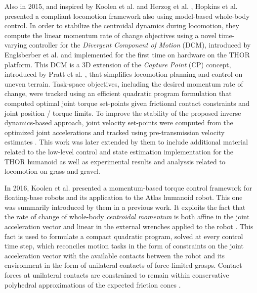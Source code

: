 	Also in 2015, and inspired by Koolen et al. \cite{Koolen_Humanoids2013} and Herzog et al.
	\cite{Herzog_IROS2014}, Hopkins et al. \cite{Hopkins_ICRA2015} presented a compliant locomotion
	framework also using model-based whole-body control.
	In order to stabilize the centroidal dynamics during locomotion, they compute the linear momentum
	rate of change objectives using a	novel time-varying controller for the
	\emph{Divergent Component of Motion} (DCM), introduced by	Englsberber et al. \cite{Englsberger_IROS2013}
	and implemented for the first time on hardware on the THOR platform.
	This DCM is a 3D extension of the \emph{Capture Point} (CP) concept, introduced by Pratt et al.
	\cite{Pratt_Humanoids2006}, that simplifies locomotion planning and control on uneven terrain.
	Task-space objectives, including the desired momentum rate of change, were tracked using an efficient
	quadratic program formulation that computed optimal joint torque set-points given frictional contact
	constraints and joint position / torque limits.
	To improve the stability of the proposed inverse dynamics-based approach, joint velocity set-points
	were computed from the optimized joint accelerations and tracked using pre-transmission velocity
	estimates	\cite{Hopkins_ICRA2015}.
	This work was later extended by them \cite{Hopkins_IJHR2016} to include additional material related
	to the low-level control and state estimation implementation for the THOR humanoid as well as
	experimental results and analyssis related to locomotion on grass and gravel.
	
	In 2016, Koolen et al. \cite{Koolen_IJHR2016} presented a momentum-based torque control framework for
	floating-base robots and its application to the Atlas humanoid robot.
	This one was summarily introduced by them \cite{Koolen_Humanoids2013} in a previous work.
	It exploits the fact that the rate of change of whole-body \emph{centroidal momentum}
	is both affine in the joint acceleration vector and linear in the external wrenches applied to the
	robot \cite{Orin_IROS2008}.
	This fact is used to formulate a compact quadratic program, solved at every control time step, which
	reconciles motion tasks in the form of constraints on the joint acceleration vector with the available
	contacts between the robot and its environment in the form of unilateral contacts of force-limited
	grasps.
	Contact forces at unilateral contacts are constrained to remain within conservative polyhedral
	approximations of the expected friction cones \cite{Koolen_IJHR2016}.
	
